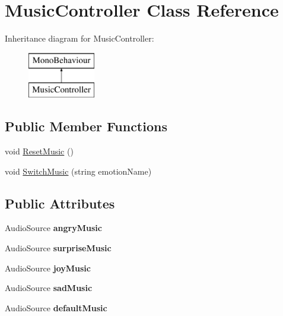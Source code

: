 \hypertarget{class_music_controller}{}\section{Music\+Controller Class Reference}
\label{class_music_controller}
Inheritance diagram for Music\+Controller\+:\begin{figure}[H]
\begin{center}
\leavevmode
\includegraphics[height=2.000000cm]{class_music_controller}
\end{center}
\end{figure}
\subsection*{Public Member Functions}
\begin{DoxyCompactItemize}
\item 
void \mbox{\hyperlink{class_music_controller_ae16b96ac7e2075229191a3cdd4765bde}{Reset\+Music}} ()
\item 
void \mbox{\hyperlink{class_music_controller_a59a194df4e895834b0639bd6c750a7b9}{Switch\+Music}} (string emotion\+Name)
\end{DoxyCompactItemize}
\subsection*{Public Attributes}
\begin{DoxyCompactItemize}
\item 
\mbox{\label{class_music_controller_ab0bb155ce5f1b815b305669331a90fe5}} 
Audio\+Source {\bfseries angry\+Music}
\item 
\mbox{\label{class_music_controller_af4ba091238f0ee7461d42465404d95c5}} 
Audio\+Source {\bfseries surprise\+Music}
\item 
\mbox{\label{class_music_controller_a87d576a31e3db7fbdab7c5817d71e7e3}} 
Audio\+Source {\bfseries joy\+Music}
\item 
\mbox{\label{class_music_controller_af598d267c360c23c378e8ab4bd502a5b}} 
Audio\+Source {\bfseries sad\+Music}
\item 
\mbox{\label{class_music_controller_aae5ff401321f0aaa900244764633fb99}} 
Audio\+Source {\bfseries default\+Music}
\end{DoxyCompactItemize}
